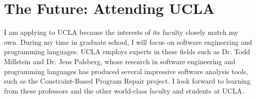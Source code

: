 \section*{The Future: Attending UCLA}
I am applying to UCLA because the interests of its faculty closely match my own. 
During my time in graduate school, I will focus on software engineering and programming languages. 
UCLA employs experts in these fields such as Dr. Todd Millstein and Dr. Jens Palsberg, whose research in software engineering and programming languages has produced several impressive software analysis tools, 
such as the Constraint-Based Program Repair project. 
I look forward to learning from these professors and the other world-class faculty and students at UCLA.
